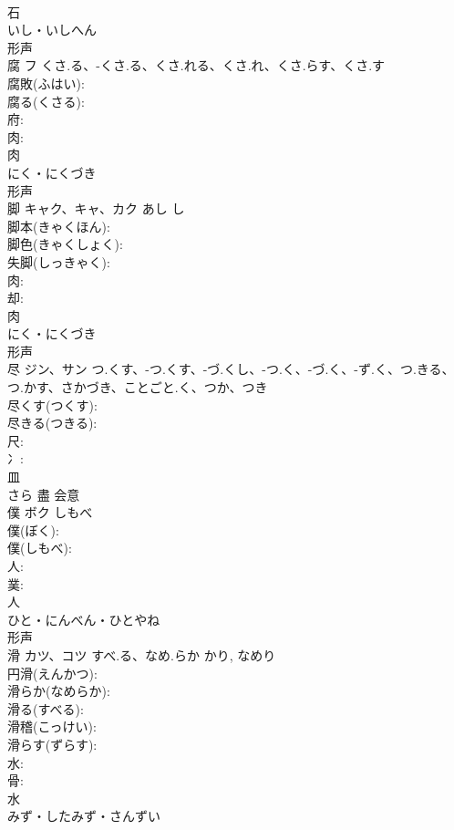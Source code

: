 \documentclass[8pt]{extreport}
\begin{document}
\begin{CJK}{UTF8}{min}
\\	石	
\\	いし・いしへん	
\\	形声 
\\	腐	フ	くさ.る、-くさ.る、くさ.れる、くさ.れ、くさ.らす、くさ.す		
\\	腐敗(ふはい): 
\\	腐る(くさる): 
\\	府: 
\\	肉: 
\\	肉	
\\	にく・にくづき	
\\	形声 
\\	脚	キャク、キャ、カク	あし	し	
\\	脚本(きゃくほん): 
\\	脚色(きゃくしょく): 
\\	失脚(しっきゃく): 
\\	肉: 
\\	却: 
\\	肉	
\\	にく・にくづき	
\\	形声 
\\	尽	ジン、サン	つ.くす、-つ.くす、-づ.くし、-つ.く、-づ.く、-ず.く、つ.きる、つ.かす、さかづき、ことごと.く、つか、つき		
\\	尽くす(つくす): 
\\	尽きる(つきる): 
\\	尺: 
\\	冫: 
\\	皿	
\\	さら	盡	会意 
\\	僕	ボク	しもべ		
\\	僕(ぼく): 
\\	僕(しもべ): 
\\	人: 
\\	菐: 
\\	人	
\\	ひと・にんべん・ひとやね	
\\	形声 
\\	滑	カツ、コツ	すべ.る、なめ.らか	かり, なめり	
\\	円滑(えんかつ): 
\\	滑らか(なめらか): 
\\	滑る(すべる): 
\\	滑稽(こっけい): 
\\	滑らす(ずらす): 
\\	水: 
\\	骨: 
\\	水	
\\	みず・したみず・さんずい	

\end{CJK}
\end{document}
